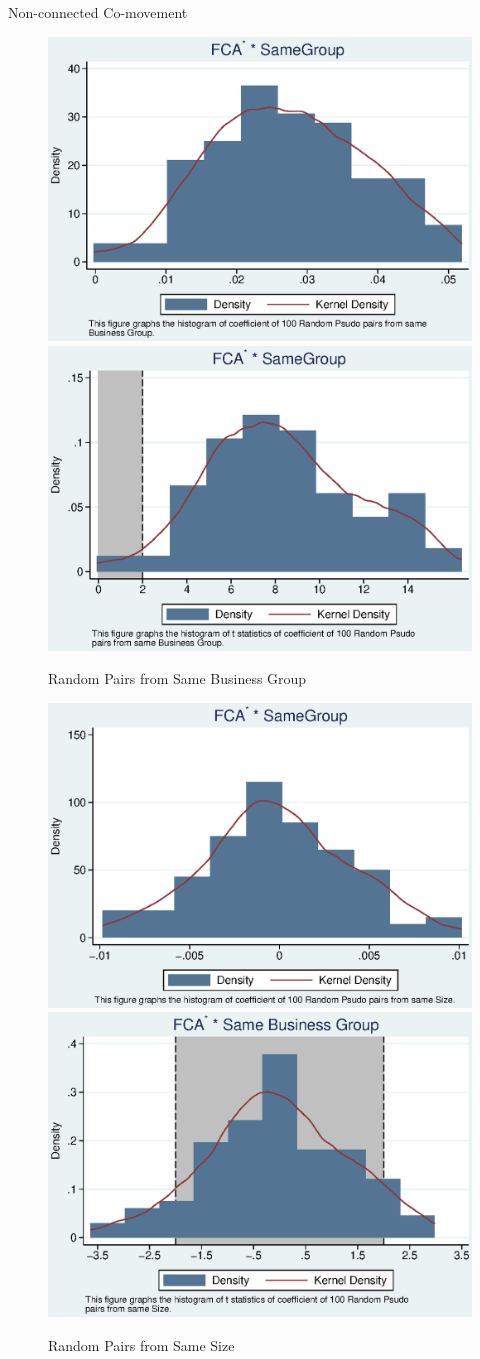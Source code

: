 \documentclass[12pt, a4paper]{article}
\begin{document}
		\begin{table}[htbp]
	\centering
	\caption{Non-connected Co-movement}
%		
\label{AllPairs}
	\resizebox{\textwidth}{!}{
		
	}
\end{table}

\FloatBarrier






		
		\begin{figure}
			\centering
			\caption{Random Pairs from Same Business Group}
			\includegraphics[width=0.45\linewidth]{BusinessPseudoSBFCA.eps}
			\includegraphics[width=0.45\linewidth]{BusinessPseudoSBFCA_t.eps}
		\end{figure}







		\begin{figure}
			\centering
			\caption{Random Pairs from Same Size}
			\includegraphics[width=0.45\linewidth]{SizePseudoSBFCA.eps}
			\includegraphics[width=0.45\linewidth]{SizePseudoSBFCA_t.eps}
		\end{figure}
\end{document}
